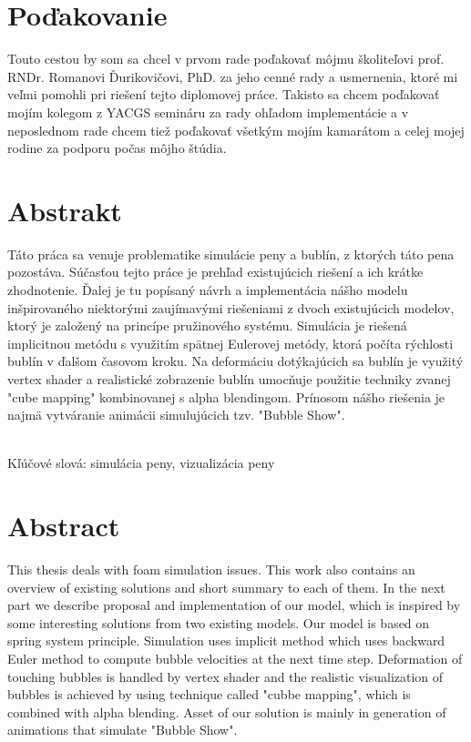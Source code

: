 \documentclass[12pt, a4paper, oneside]{book}
\begin{document}
\chapter*{Poďakovanie}\label{chap:thank_you}
Touto cestou by som sa chcel v prvom rade poďakovať môjmu školiteľovi prof. RNDr. Romanovi Ďurikovičovi, PhD. za jeho cenné rady a usmernenia, ktoré mi veľmi pomohli pri riešení tejto diplomovej práce. Takisto sa chcem poďakovať mojím kolegom z YACGS semináru za rady ohľadom implementácie a v neposlednom rade chcem tiež poďakovať všetkým mojím kamarátom a celej mojej rodine za podporu počas môjho štúdia. 
\vfill\eject 

\chapter*{Abstrakt}\label{chap:abstract_sk}
Táto práca sa venuje problematike simulácie peny a bublín, z ktorých táto pena pozostáva. Súčasťou tejto práce je prehľad existujúcich riešení a ich krátke zhodnotenie. Ďalej je tu popísaný návrh a implementácia nášho modelu inšpirovaného niektorými zaujímavými riešeniami z dvoch existujúcich modelov, ktorý je založený na princípe pružinového systému. Simulácia je riešená implicitnou metódu s využitím spätnej Eulerovej metódy, ktorá počíta rýchlosti bublín v ďalšom časovom kroku. Na deformáciu dotýkajúcich sa bublín je využitý vertex shader a realistické zobrazenie bublín umocňuje použitie techniky zvanej "cube mapping" kombinovanej s alpha blendingom. Prínosom nášho riešenia je najmä vytváranie animácii simulujúcich tzv. "Bubble Show".

~\\
Kľúčové slová: simulácia peny, vizualizácia peny
\vfill\eject 

\chapter*{Abstract}\label{chap:abstract_en}
This thesis deals with foam simulation issues. This work also contains an overview of existing solutions and short summary to each of them. In the next part we describe proposal and implementation of our model, which is inspired by some interesting solutions from two existing models. Our model is based on spring system principle. Simulation uses implicit method which uses backward Euler method to compute bubble velocities at the next time step. Deformation of touching bubbles is handled by vertex shader and the realistic visualization of bubbles is achieved by using technique called "cubbe mapping", which is combined with alpha blending. Asset of our solution is mainly in generation of animations that simulate "Bubble Show".
\end{document}
